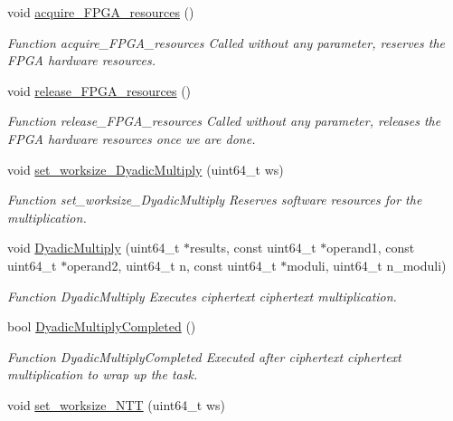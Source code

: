 \begin{DoxyCompactItemize}
\item 
void \hyperlink{namespaceintel_1_1hexl_a6236e14eaac1602475c5f4e0a42754fe}{acquire\-\_\-\-F\-P\-G\-A\-\_\-resources} ()
\begin{DoxyCompactList}\small\item\em Function acquire\-\_\-\-F\-P\-G\-A\-\_\-resources Called without any parameter, reserves the F\-P\-G\-A hardware resources. \end{DoxyCompactList}\item 
void \hyperlink{namespaceintel_1_1hexl_a717589c6dbfa6429b61e42c620d72d89}{release\-\_\-\-F\-P\-G\-A\-\_\-resources} ()
\begin{DoxyCompactList}\small\item\em Function release\-\_\-\-F\-P\-G\-A\-\_\-resources Called without any parameter, releases the F\-P\-G\-A hardware resources once we are done. \end{DoxyCompactList}\item 
void \hyperlink{namespaceintel_1_1hexl_a0721fea3151425a86da2201107e3ddcc}{set\-\_\-worksize\-\_\-\-Dyadic\-Multiply} (uint64\-\_\-t ws)
\begin{DoxyCompactList}\small\item\em Function set\-\_\-worksize\-\_\-\-Dyadic\-Multiply Reserves software resources for the multiplication. \end{DoxyCompactList}\item 
void \hyperlink{namespaceintel_1_1hexl_ae4e26f2cb97a43a2b81fe8643b6edf17}{Dyadic\-Multiply} (uint64\-\_\-t $\ast$results, const uint64\-\_\-t $\ast$operand1, const uint64\-\_\-t $\ast$operand2, uint64\-\_\-t n, const uint64\-\_\-t $\ast$moduli, uint64\-\_\-t n\-\_\-moduli)
\begin{DoxyCompactList}\small\item\em Function Dyadic\-Multiply Executes ciphertext ciphertext multiplication. \end{DoxyCompactList}\item 
bool \hyperlink{namespaceintel_1_1hexl_a638ef00009ae573955d1138b9fb03363}{Dyadic\-Multiply\-Completed} ()
\begin{DoxyCompactList}\small\item\em Function Dyadic\-Multiply\-Completed Executed after ciphertext ciphertext multiplication to wrap up the task. \end{DoxyCompactList}\item 
void \hyperlink{namespaceintel_1_1hexl_af64feb2684e5467b69273aeb64d73b32}{set\-\_\-worksize\-\_\-\-N\-T\-T} (uint64\-\_\-t ws)

\end{DoxyCompactItemize}
